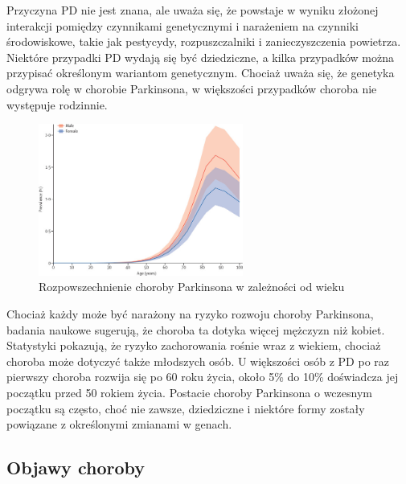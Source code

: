 Przyczyna PD nie jest znana, ale uważa się, że powstaje w wyniku złożonej interakcji pomiędzy czynnikami genetycznymi i
narażeniem na czynniki środowiskowe, takie jak pestycydy, rozpuszczalniki i zanieczyszczenia powietrza.
Niektóre przypadki PD wydają się być dziedziczne, a kilka przypadków można przypisać określonym wariantom genetycznym.
Chociaż uważa się, że genetyka odgrywa rolę w chorobie Parkinsona, w większości przypadków choroba nie występuje rodzinnie\cite{National_Institute_on_Aging_2022}.

\begin{figure}[htbp]
	\centering
	\includegraphics[width=0.6\textwidth]{./img/PD_prevalence}
	\caption{Rozpowszechnienie choroby Parkinsona w zależności od wieku \cite{global_PD}}
    \label{fig:PD_prevalance}
\end{figure}

Chociaż każdy może być narażony na ryzyko rozwoju choroby Parkinsona, badania naukowe sugerują,
że choroba ta dotyka więcej mężczyzn niż kobiet.
Statystyki pokazują, że ryzyko zachorowania rośnie wraz z wiekiem, chociaż choroba może dotyczyć także młodszych osób.
U większości osób z PD po raz pierwszy choroba rozwija się po 60 roku życia, około 5\% do 10\% doświadcza jej początku przed 50 rokiem życia.
Postacie choroby Parkinsona o wczesnym początku są często, choć nie zawsze, dziedziczne i niektóre formy zostały powiązane z
określonymi zmianami w genach\cite{National_Institute_on_Aging_2022}.


\subsection{Objawy choroby}
\label{subsec:objawy}

